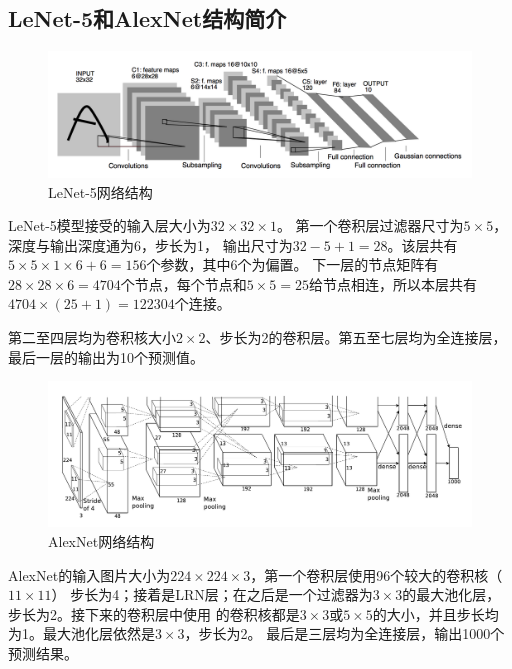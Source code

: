 \subsection{\hei\xiaosan\textbf{LeNet-5和AlexNet结构简介}}
  \begin{figure}[htbp]
    \centering
    \includegraphics[width=\textwidth, natwidth=1612, natheight=482]{resource/second/LeNet-5.png}
    \caption{LeNet-5网络结构}
    \label{Figure.Third.3}
  \end{figure}
  LeNet-5模型接受的输入层大小为$32\times32\times1$。
  第一个卷积层过滤器尺寸为$5\times5$，深度与输出深度通为6，步长为1，
  输出尺寸为$32-5+1=28$。该层共有$5\times5\times1\times6+6=156$个参数，其中6个为偏置。
  下一层的节点矩阵有$28\times28\times6=4704$个节点，每个节点和$5\times5=25$给节点相连，所以本层共有
  $4704\times(25+1)=122304$个连接。

  第二至四层均为卷积核大小$2\times2$、步长为2的卷积层。第五至七层均为全连接层，最后一层的输出为10个预测值。


  \begin{figure}[htbp]
    \centering
    \includegraphics[width=\textwidth]{resource/second/AlexNet.png}
    \caption{AlexNet网络结构}
    \label{Figure.Third.4}
  \end{figure}
  AlexNet的输入图片大小为$224\times224\times3$，第一个卷积层使用96个较大的卷积核（$11\times11$）
  步长为4；接着是LRN层；在之后是一个过滤器为$3\times3$的最大池化层，步长为2。接下来的卷积层中使用
  的卷积核都是$3\times3$或$5\times5$的大小，并且步长均为1。最大池化层依然是$3\times3$，步长为2。
  最后是三层均为全连接层，输出1000个预测结果。

